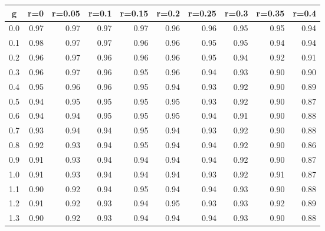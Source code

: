 %
\begin{table}[!tbp]
 \begin{center}
 \begin{tabular}{rrrrrrrrrr}\hline\hline
\multicolumn{1}{c}{g}&\multicolumn{1}{c}{r=0}&\multicolumn{1}{c}{r=0.05}&\multicolumn{1}{c}{r=0.1}&\multicolumn{1}{c}{r=0.15}&\multicolumn{1}{c}{r=0.2}&\multicolumn{1}{c}{r=0.25}&\multicolumn{1}{c}{r=0.3}&\multicolumn{1}{c}{r=0.35}&\multicolumn{1}{c}{r=0.4}\tabularnewline
\hline
0.0&0.97&0.97&0.97&0.97&0.96&0.96&0.95&0.95&0.94\tabularnewline
0.1&0.98&0.97&0.97&0.96&0.96&0.95&0.95&0.94&0.94\tabularnewline
0.2&0.96&0.97&0.96&0.96&0.96&0.95&0.94&0.92&0.91\tabularnewline
0.3&0.96&0.97&0.96&0.95&0.96&0.94&0.93&0.90&0.90\tabularnewline
0.4&0.95&0.96&0.96&0.95&0.94&0.93&0.92&0.90&0.89\tabularnewline
0.5&0.94&0.95&0.95&0.95&0.95&0.93&0.92&0.90&0.87\tabularnewline
0.6&0.94&0.94&0.95&0.95&0.95&0.94&0.91&0.90&0.88\tabularnewline
0.7&0.93&0.94&0.94&0.95&0.94&0.93&0.92&0.90&0.88\tabularnewline
0.8&0.92&0.93&0.94&0.95&0.94&0.94&0.92&0.90&0.86\tabularnewline
0.9&0.91&0.93&0.94&0.94&0.94&0.94&0.92&0.90&0.87\tabularnewline
1.0&0.91&0.93&0.94&0.94&0.94&0.93&0.92&0.91&0.87\tabularnewline
1.1&0.90&0.92&0.94&0.95&0.94&0.94&0.93&0.90&0.88\tabularnewline
1.2&0.91&0.92&0.93&0.94&0.95&0.93&0.93&0.92&0.89\tabularnewline
1.3&0.90&0.92&0.93&0.94&0.94&0.94&0.93&0.90&0.88\tabularnewline
\hline
\end{tabular}

\end{center}

\end{table}

